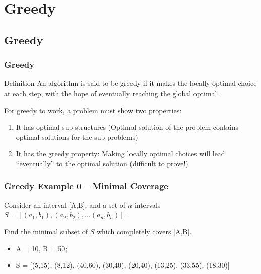 \documentclass{beamer}
\begin{document}
\section{Greedy}
\subsection{Greedy}
\begin{frame}
  \frametitle{Greedy}

  \begin{block}{Definition}
    An algorithm is said to be greedy if it makes the locally optimal
    choice at each step, with the hope of eventually reaching the
    global optimal.
  \end{block}

  \vfill

  For greedy to work, a problem must show two properties:
  \begin{enumerate}
  \item It has optimal sub-structures (Optimal solution of the problem
    contains optimal solutions for the sub-problems)
  \item It has the greedy property: Making locally optimal choices
    will lead ``eventually'' to the optimal solution (difficult to
    prove!)
  \end{enumerate}

\end{frame}

\begin{frame}
  \frametitle{Greedy Example 0 -- Minimal Coverage}

  \begin{block}{}
    Consider an interval [A,B], and a set of $n$ intervals $S =
    [(a_1,b_1), (a_2,b_2), \ldots (a_n,b_n)]$.

    \medskip

    Find the minimal subset
    of $S$ which completely covers [A,B].
  \end{block}

  \bigskip

  \begin{itemize}
  \item A = 10, B = 50;

    \bigskip


  \item S = [(5,15), (8,12), (40,60), (30,40), (20,40), (13,25),
    (33,55), (18,30)]
  \end{itemize}
\end{frame}
\end{document}
